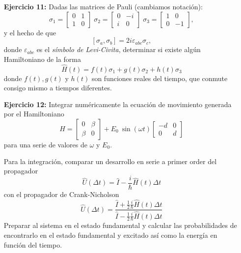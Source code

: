 \documentclass[a4paper,12pt]{article}
\begin{document}
\begin{enumerate}
    \item[\bf Ejercicio 11:] Dadas las matrices de Pauli (cambiamos notación):
    \begin{equation}
        \sigma_1 = \begin{bmatrix}
            0 & 1 \\
            1 & 0 
            \end{bmatrix}\;
        \sigma_2 = \begin{bmatrix}
            0 & -i \\
            i & 0 
            \end{bmatrix}\;
        \sigma_3 = \begin{bmatrix}
            1 & 0 \\
            0 & -1 
            \end{bmatrix},
    \end{equation} 
    y el hecho de que 
    \[\left[\sigma_{a}, \sigma_{b}\right]=2 i \varepsilon_{a b c} \sigma_{c},\]
    donde $\varepsilon_{a b c}$ es el {\em símbolo de Levi-Civita}, determinar si existe algún Hamiltoniano de la forma
    \[\hat{H}(t)=f(t)\sigma_1+g(t)\sigma_2+h(t)\sigma_3\]
    donde $f(t),g(t)$ y $h(t)$ son funciones reales del tiempo, que conmute consigo mismo a tiempos diferentes. 
    
    \item[\bf Ejercicio 12:] Integrar numéricamente la ecuación de movimiento generada por el Hamiltoniano
    $$H = \begin{bmatrix}
          0 & \beta \\
          \beta & 0 
          \end{bmatrix}
        +
        E_0\ \sin(\omega t) \begin{bmatrix}
            -d & 0 \\
            0 & d 
            \end{bmatrix}$$ 
    para una serie de valores de $\omega$ y $E_0$.

    Para la integración, comparar un desarrollo en serie a primer order del propagador
    $$ \hat{U}(\Delta t) = \hat{I} - \frac{i}{\hbar}\hat{H}(t)\Delta t$$
    con el propagador de Crank-Nicholson
    $$ \hat{U}(\Delta t) = \frac{\hat{I}+\frac{1}{2}\frac{i}{\hbar}\hat{H}(t)\Delta t}
    {\hat{I}-\frac{1}{2}\frac{i}{\hbar}\hat{H}(t)\Delta t}$$
    Preparar al sistema en el estado fundamental y calcular las probabilidades de encontrarlo en el estado fundamental y excitado así como la energía en función del tiempo.


\end{enumerate}
\end{document}
